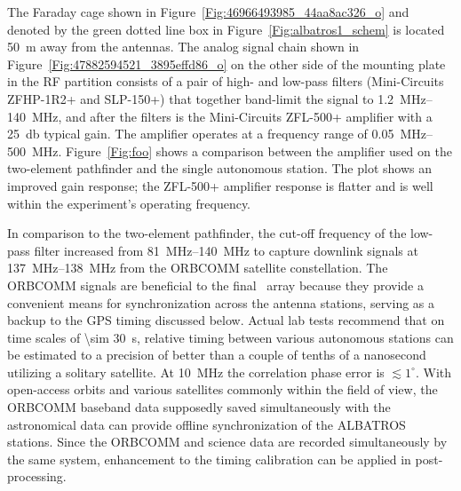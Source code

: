 
The Faraday cage shown in Figure~\ref{Fig:46966493985_44aa8ac326_o} and denoted by the green dotted line box in Figure~\ref{Fig:albatros1_schem} is located \SI{50}{\meter} away from the antennas. The analog signal chain shown in Figure~\ref{Fig:47882594521_3895effd86_o} on the other side of the mounting plate in the RF partition consists of a pair of high- and low-pass filters (Mini-Circuits ZFHP-1R2+ and SLP-150+) that together band-limit the signal to \SIrange{1.2}{140}{\mega\hertz}, and after the filters is the Mini-Circuits ZFL-500+ amplifier with a \SI{25}{\decibel} typical gain. The amplifier operates at a frequency range of \SIrange{0.05}{500}{\mega\hertz}. Figure~\ref{Fig:foo} shows a comparison between the amplifier used on the two-element pathfinder and the single autonomous station. The plot shows an improved gain response; the ZFL-500+ amplifier response is flatter and is well within the experiment's operating frequency.

In comparison to the two-element pathfinder, the cut-off frequency of the low-pass filter increased from \SIrange{81}{140}{\mega\hertz} to capture downlink signals at \SIrange{137}{138}{\mega\hertz} from the ORBCOMM satellite constellation. The ORBCOMM signals are beneficial to the final \albatros\ array because they provide a convenient means for synchronization across the antenna stations, serving as a backup to the GPS timing discussed below. Actual lab tests recommend that on time scales of \SI{\sim 30}{\second}, relative timing between various autonomous stations can be estimated to a precision of better than a couple of tenths of a nanosecond utilizing a solitary satellite. At \SI{10}{\mega\hertz} the correlation phase error is $\lesssim1^\circ$. With open-access orbits and various satellites commonly within the field of view, the ORBCOMM baseband data supposedly saved simultaneously with the astronomical data can provide offline synchronization of the ALBATROS stations. Since the ORBCOMM and science data are recorded simultaneously by the same system, enhancement to the timing calibration can be applied in post-processing.

